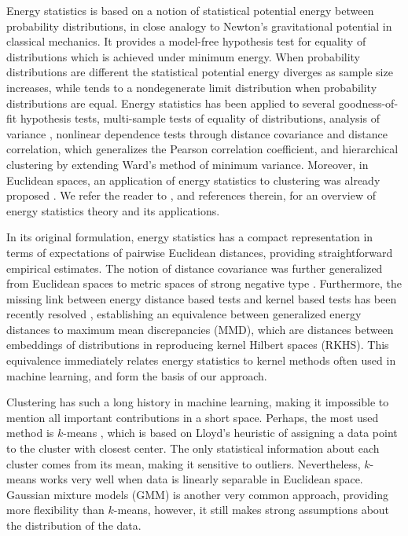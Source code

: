 \documentclass[aps,preprint,nofootinbib,floatfix]{revtex4-1}
\begin{document}
Energy statistics \cite{Szkely2013}
is based on a 
notion of statistical potential energy between probability distributions,
in close analogy to Newton's gravitational potential in classical mechanics.
It provides a model-free hypothesis test for equality of 
distributions which is achieved 
under minimum energy. When probability distributions are different the 
statistical potential energy diverges as sample size increases, while tends 
to a nondegenerate limit distribution when probability
distributions are equal. 
Energy statistics has been applied to several goodness-of-fit 
hypothesis tests, multi-sample tests of equality of distributions, 
analysis of variance \cite{RizzoVariance}, nonlinear dependence tests through
distance covariance and distance correlation, which generalizes the Pearson
correlation coefficient, and hierarchical clustering \cite{RizzoClustering} 
by extending Ward's method of minimum variance. Moreover, 
in Euclidean spaces, an application of 
energy statistics to clustering
was already proposed \cite{Kgroups}. 
We refer the reader to \cite{Szkely2013}, 
and references therein, for an overview of energy statistics theory and 
its applications.

In its original formulation, energy statistics has a compact representation
in terms of expectations of pairwise Euclidean distances, providing
straightforward empirical estimates. 
The notion of distance covariance was further generalized from Euclidean 
spaces to metric spaces of strong negative type \cite{Lyons}. Furthermore, 
the missing link between energy distance based tests and kernel 
based tests has 
been recently resolved \cite{Sejdinovic2013}, 
establishing an equivalence between generalized energy distances to maximum
mean discrepancies (MMD), which are distances between embeddings of 
distributions in reproducing kernel Hilbert spaces (RKHS).
This equivalence immediately relates energy statistics to
kernel methods often used in machine learning, and form the basis 
of our approach.

Clustering has such a long history in machine learning, making it
impossible to mention all important contributions in a short space. 
Perhaps, the most used method is $k$-means \cite{Lloyd,MacQueen,Forgy}, which
is based on Lloyd's heuristic \cite{Lloyd} of assigning a data point to
the cluster with closest center. The only statistical 
information about each cluster comes from its mean, making it sensitive 
to outliers. Nevertheless, $k$-means works very well when data is 
linearly separable in Euclidean space. Gaussian mixture models (GMM) is 
another very common approach, providing more flexibility than $k$-means, 
however, it still makes strong assumptions about the distribution of 
the data.
\end{document}
